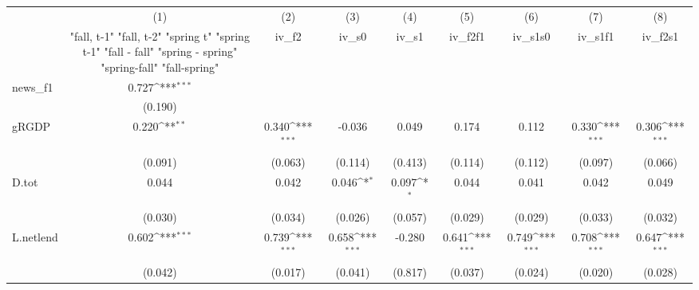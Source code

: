 {
\def\sym#1{\ifmmode^{#1}\else\(^{#1}\)\fi}
\begin{tabular}{l*{8}{c}}
\toprule
            &\multicolumn{1}{c}{(1)}&\multicolumn{1}{c}{(2)}&\multicolumn{1}{c}{(3)}&\multicolumn{1}{c}{(4)}&\multicolumn{1}{c}{(5)}&\multicolumn{1}{c}{(6)}&\multicolumn{1}{c}{(7)}&\multicolumn{1}{c}{(8)}\\
            &\multicolumn{1}{c}{  "fall, t-1" "fall, t-2" "spring t" "spring t-1"  "fall - fall" "spring - spring" "spring-fall" "fall-spring" }&\multicolumn{1}{c}{iv\_f2}&\multicolumn{1}{c}{iv\_s0}&\multicolumn{1}{c}{iv\_s1}&\multicolumn{1}{c}{iv\_f2f1}&\multicolumn{1}{c}{iv\_s1s0}&\multicolumn{1}{c}{iv\_s1f1}&\multicolumn{1}{c}{iv\_f2s1}\\
\midrule
news\_f1     &       0.727\sym{***}&                     &                     &                     &                     &                     &                     &                     \\
            &     (0.190)         &                     &                     &                     &                     &                     &                     &                     \\
\addlinespace
gRGDP       &       0.220\sym{**} &       0.340\sym{***}&      -0.036         &       0.049         &       0.174         &       0.112         &       0.330\sym{***}&       0.306\sym{***}\\
            &     (0.091)         &     (0.063)         &     (0.114)         &     (0.413)         &     (0.114)         &     (0.112)         &     (0.097)         &     (0.066)         \\
\addlinespace
D.tot       &       0.044         &       0.042         &       0.046\sym{*}  &       0.097\sym{*}  &       0.044         &       0.041         &       0.042         &       0.049         \\
            &     (0.030)         &     (0.034)         &     (0.026)         &     (0.057)         &     (0.029)         &     (0.029)         &     (0.033)         &     (0.032)         \\
\addlinespace
L.netlend   &       0.602\sym{***}&       0.739\sym{***}&       0.658\sym{***}&      -0.280         &       0.641\sym{***}&       0.749\sym{***}&       0.708\sym{***}&       0.647\sym{***}\\
            &     (0.042)         &     (0.017)         &     (0.041)         &     (0.817)         &     (0.037)         &     (0.024)         &     (0.020)         &     (0.028)         \\

\end{tabular}}
